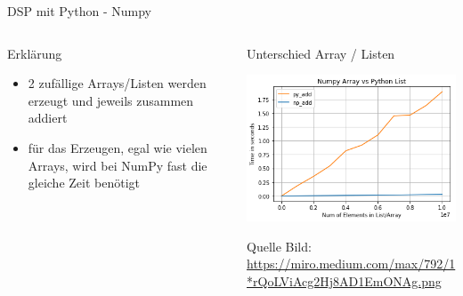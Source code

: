 \documentclass[8pt]{beamer}
\begin{document}
\begin{frame}[label={sec:orgf83de88}]{DSP mit Python - Numpy}
\begin{columns}
\begin{column}{0.5\columnwidth}
\begin{block}{Erklärung}
\begin{itemize}
\item 2 zufällige Arrays/Listen werden erzeugt und jeweils zusammen addiert
\item für das Erzeugen, egal wie vielen Arrays, wird bei NumPy fast die gleiche Zeit benötigt
\end{itemize}
\end{block}
\end{column}

\begin{column}{0.5\columnwidth}
\begin{block}{Unterschied Array / Listen}
\begin{center}
\includegraphics[width=.9\linewidth]{./image/vergleich_array.png}
\end{center}

\vspace{1mm}
Quelle Bild:
\url{https://miro.medium.com/max/792/1*rQoLViAcg2Hj8AD1EmONAg.png}
\end{block}
\end{column}
\end{columns}
\end{frame}
\end{document}
